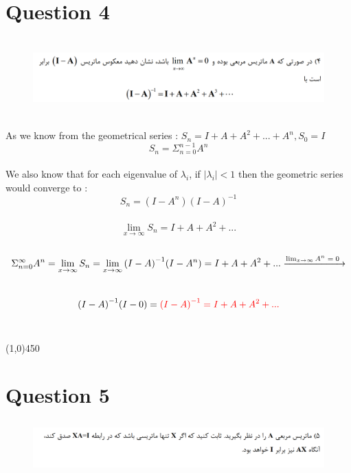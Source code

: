 \documentclass[a4paper,12pt]{article}
\begin{document}
\newpage
\section {Question 4 }


\begin{figure}[h!]
	\centering
	\includegraphics*[height=3cm]{Q4}
\end{figure}
\begin{doublespace}
As we know from the geometrical series : $S_n = I + A + A^2 + ... + A^n , S_0 = I $\\
\[ S_n  = \Sigma_{n=0}^{n-1} A^n \] \\
We also know that for each eigenvalue of $\lambda_i $, if $|\lambda_i| < 1 $ then the geometric series would converge to :\\
 \[S_n = (I-A^n)(I-A)^{-1}\]\\
 \[ \lim_{x \to \infty } S_n =   I + A + A^2 + ... \]\\
\[ \Sigma_{n=0}^{\infty} A^n =  \lim_{x \to \infty } S_n =  \lim_{x \to \infty} {{(I-A)}^{-1}(I-A^n)} =   I + A + A^2 + ...  \xrightarrow{\text{$ \lim_{x \to \infty} A^n = 0 $  }}   \] \\
\[   {(I-A)}^{-1} (I-0) =   \textcolor{red} { {(I-A)}^{-1} =  I + A + A^2 + ...  }  \] \\

\end{doublespace}

\line(1,0){450}

\newpage
\section {Question 5 }

\begin{figure}[h!]
	\centering
	\includegraphics*[height=2cm]{Q5}
\end{figure}
\end{document}
